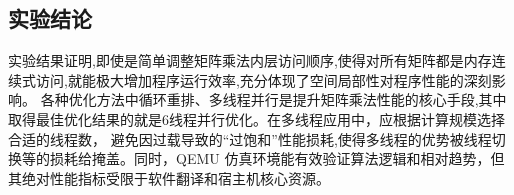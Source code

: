 \subsection{实验结论}
实验结果证明,即使是简单调整矩阵乘法内层访问顺序,使得对所有矩阵都是内存连续式访问,就能极大增加程序运行效率,充分体现了空间局部性对程序性能的深刻影响。
各种优化方法中循环重排、多线程并行是提升矩阵乘法性能的核心手段,其中取得最佳优化结果的就是6线程并行优化。在多线程应用中，应根据计算规模选择合适的线程数，
避免因过载导致的“过饱和”性能损耗,使得多线程的优势被线程切换等的损耗给掩盖。同时，QEMU 仿真环境能有效验证算法逻辑和相对趋势，但其绝对性能指标受限于软件翻译和宿主机核心资源。